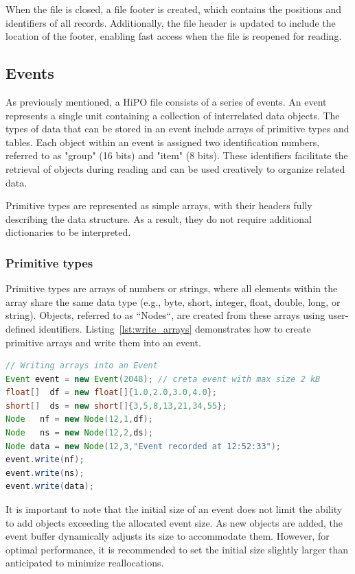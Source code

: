 \documentclass[preprint,12pt]{elsarticle}
\begin{document}
When the file is closed, a file footer is created, which contains the positions and identifiers of all records. Additionally, the file header is updated to include the location of the footer, enabling fast access when the file is reopened for reading.

\subsection{Events}

As previously mentioned, a HiPO file consists of a series of events. An event represents a single unit containing a collection of interrelated data objects. The types of data that can be stored in an event include arrays of primitive types and tables. Each object within an event is assigned two identification numbers, referred to as "group" (16 bits) and "item" (8 bits). These identifiers facilitate the retrieval of objects during reading and can be used creatively to organize related data. 

Primitive types are represented as simple arrays, with their headers fully describing the data structure. As a result, they do not require additional dictionaries to be interpreted.

\subsubsection{Primitive types}

Primitive types are arrays of numbers or strings, where all elements within the array share the same data type (e.g., byte, short, integer, float, double, long, or string). Objects, referred to as ``Nodes``, are created from these arrays using user-defined identifiers. Listing~\ref{lst:write_arrays} demonstrates how to create primitive arrays and write them into an event.

\begin{lstlisting}[language=java, caption=Java example to create and write primitive types into an event, label=lst:write_arrays]
// Writing arrays into an Event
Event event = new Event(2048); // creta event with max size 2 kB
float[]  df = new float[]{1.0,2.0,3.0,4.0};
short[]  ds = new short[]{3,5,8,13,21,34,55};
Node   nf = new Node(12,1,df);
Node   ns = new Node(12,2,ds);
Node data = new Node(12,3,"Event recorded at 12:52:33"); 
event.write(nf);
event.write(ns);
event.write(data);
\end{lstlisting}

It is important to note that the initial size of an event does not limit the ability to add objects exceeding the allocated event size. As new objects are added, the event buffer dynamically adjusts its size to accommodate them. However, for optimal performance, it is recommended to set the initial size slightly larger than anticipated to minimize reallocations.
\end{document}
